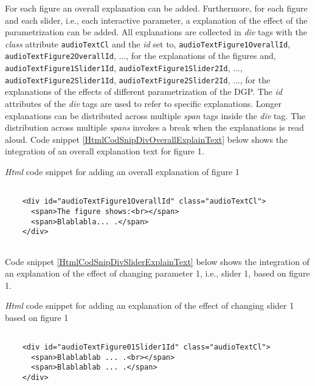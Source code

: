\documentclass[12pt]{article}
\begin{document}
For each figure an overall explanation can be added. 
% 
Furthermore, for each figure and each slider, i.e., each interactive parameter, a explanation of the effect of the parametrization can be added. 
%
All explanations are collected in \emph{div} tags with the \emph{class} attribute \texttt{audioTextCl} and the \emph{id} set to, \texttt{audioTextFigure1OverallId}, \texttt{audioTextFigure2OverallId}, ..., for the explanations of the figures and, \texttt{audioTextFigure1Slider1Id}, \texttt{audioTextFigure1Slider2Id}, ..., \texttt{audioTextFigure2Slider1Id}, \texttt{audioTextFigure2Slider2Id}, ..., for the explanations of the effects of different parametrization of the DGP. 
%
The \emph{id} attributes of the \emph{div} tags are used to refer to specific explanations. 
%
Longer explanations can be distributed across multiple \emph{span} tags inside the \emph{div} tag. 
%
The distribution across multiple \emph{spans} invokes a break when the explanations is read aloud. 
%
Code snippet \ref{HtmlCodSnipDivOverallExplainText} below shows the integration of an overall explanation text for figure 1. 
%
\begin{CodeSnippet}[!hp]
	\centering
	\caption{\emph{Html} code snippet for adding an overall explanation of figure 1}
	\footnotesize
	\vspace{0.25cm}
	\begin{BVerbatim}
		
    <div id="audioTextFigure1OverallId" class="audioTextCl">
	  <span>The figure shows:<br></span>
	  <span>Blablabla... .</span>
	</div>
		
	\end{BVerbatim}
	\label{HtmlCodSnipDivOverallExplainText}
\end{CodeSnippet}
%
Code snippet \ref{HtmlCodSnipDivSliderExplainText} below shows the integration of an explanation of the effect of changing parameter 1, i.e., slider 1, based on figure 1. 
%
\begin{CodeSnippet}[!hp]
	\centering
	\caption{\emph{Html} code snippet for adding an explanation of the effect of changing slider 1 based on figure 1}
	\footnotesize
	\vspace{0.25cm}
	\begin{BVerbatim}
		
    <div id="audioTextFigure01Slider1Id" class="audioTextCl">
	  <span>Blablablab ... .<br></span>
	  <span>Blablablab ... .</span>
	</div>
		
	\end{BVerbatim}
	\label{HtmlCodSnipDivSliderExplainText}
\end{CodeSnippet}
\end{document}

